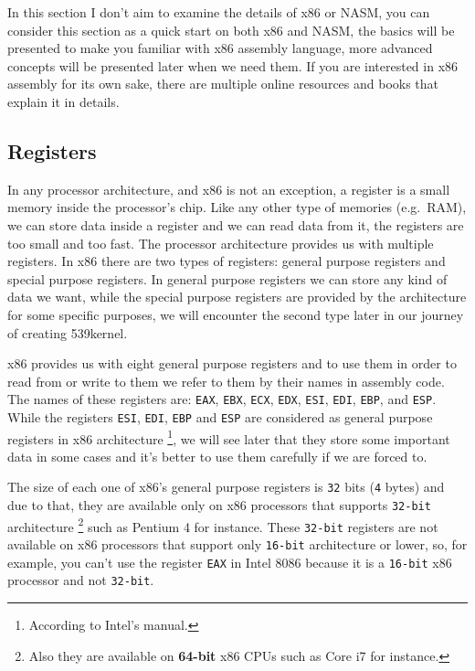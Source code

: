 In this section I don't aim to examine the details of x86 or NASM, you
can consider this section as a quick start on both x86 and NASM, the
basics will be presented to make you familiar with x86 assembly
language, more advanced concepts will be presented later when we need
them. If you are interested in x86 assembly for its own sake, there are
multiple online resources and books that explain it in details.

\subsection{Registers}\label{registers}

In any processor architecture, and x86 is not an exception, a register
is a small memory inside the processor's chip. Like any other type of
memories (e.g.~RAM), we can store data inside a register and we can read
data from it, the registers are too small and too fast. The processor
architecture provides us with multiple registers. In x86 there are two
types of registers: general purpose registers and special purpose
registers. In general purpose registers we can store any kind of data we
want, while the special purpose registers are provided by the
architecture for some specific purposes, we will encounter the second
type later in our journey of creating 539kernel.

x86 provides us with eight general purpose registers and to use them in
order to read from or write to them we refer to them by their names in
assembly code. The names of these registers are: \lstinline!EAX!,
\lstinline!EBX!, \lstinline!ECX!, \lstinline!EDX!, \lstinline!ESI!,
\lstinline!EDI!, \lstinline!EBP!, and \lstinline!ESP!. While the
registers \lstinline!ESI!, \lstinline!EDI!, \lstinline!EBP! and
\lstinline!ESP! are considered as general purpose registers in x86
architecture \footnote{According to Intel's manual.}, we will see later
that they store some important data in some cases and it's better to use
them carefully if we are forced to.

The size of each one of x86's general purpose registers is
\lstinline!32! bits (\lstinline!4! bytes) and due to that, they are
available only on x86 processors that supports \lstinline!32-bit!
architecture \footnote{Also they are available on \textbf{64-bit} x86
  CPUs such as Core i7 for instance.} such as Pentium 4 for instance.
These \lstinline!32-bit! registers are not available on x86 processors
that support only \lstinline!16-bit! architecture or lower, so, for
example, you can't use the register \lstinline!EAX! in Intel 8086
because it is a \lstinline!16-bit! x86 processor and not
\lstinline!32-bit!.

